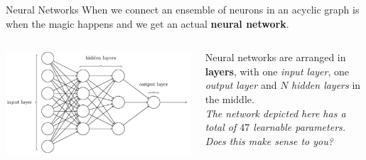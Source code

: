 \documentclass[aspectratio=169]{beamer}
\begin{document}
\begin{frame}{Neural Networks}
When we connect an ensemble of neurons in an acyclic graph is when the magic happens and we get an actual \textbf{neural network}.
\vspace{0.5cm}
\begin{columns}
\begin{column}{0.48\textwidth}
\centering
\includegraphics[width=1.0\textwidth]{img/dnn/neural_network.jpg}    \end{column}
\begin{column}{0.48\textwidth}
Neural networks are arranged in \textbf{layers}, with one \textit{input layer}, one \textit{output layer} and $N$ \textit{hidden layers} in the middle.\\
\vspace{0.5cm}
\textit{\small{The network depicted here has a total of $47$ learnable parameters. Does this make sense to you?}}
\end{column}
\end{columns}
\end{frame}

\end{document}
